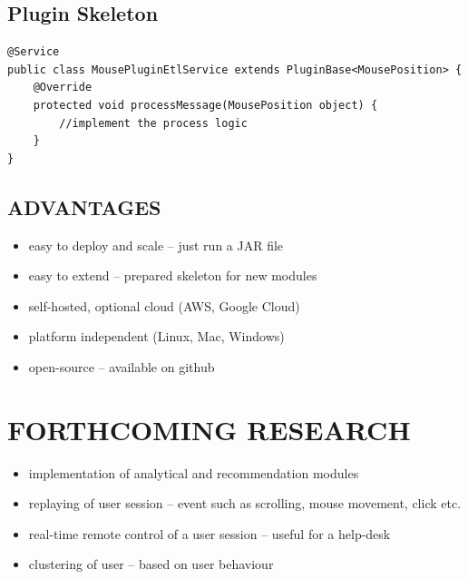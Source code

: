 \documentclass[landscape]{a0poster}
\begin{document}
\begin{multicols}{3}
\color{MainColor} 
\subsection*{Plugin Skeleton}
\color{black}


\begin{center}
\begin{lstlisting}[label={lst_plugin_etl_code}]
@Service
public class MousePluginEtlService extends PluginBase<MousePosition> {
    @Override
    protected void processMessage(MousePosition object) {
		//implement the process logic
    }
}
\end{lstlisting}
\color{MainColor}
\end{center}\vspace{1cm}

\color{MainColor} 
\subsection*{ADVANTAGES}
\color{black}
\begin{itemize}
	\item easy to deploy and scale -- just run a JAR file
	\item easy to extend -- prepared skeleton for new modules
	\item self-hosted, optional cloud (AWS, Google Cloud)
	\item platform independent (Linux, Mac, Windows)
	\item open-source -- available on github
\end{itemize}


\color{MainColor} 
\section*{FORTHCOMING RESEARCH}
\color{black}
\begin{itemize}
	\item implementation of analytical and recommendation modules
	\item replaying of user session -- event such as scrolling, mouse movement, click etc.
	\item real-time remote control of a user session -- useful for a help-desk
	\item clustering of user -- based on user behaviour
\end{itemize}




\end{multicols}
\end{document}
